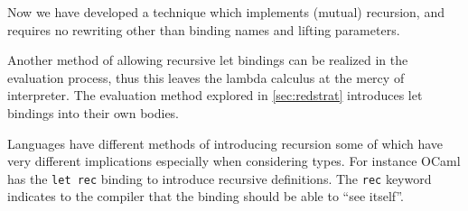 Now we have developed a technique which implements (mutual) recursion, and requires no rewriting other than binding names and lifting parameters.

Another method of allowing recursive let bindings can be realized in the evaluation process, thus this leaves the lambda calculus at the mercy of interpreter.
The evaluation method explored in \autoref{sec:redstrat} introduces let bindings into their own bodies.
\begin{remark}
  Languages have different methods of introducing recursion some of which have very different implications especially when considering types.
  For instance OCaml has the \texttt{let rec} binding to introduce recursive definitions.
  The \texttt{rec} keyword indicates to the compiler that the binding should be able to ``see itself''.
\end{remark}



